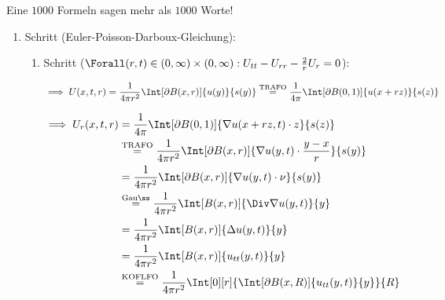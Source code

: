 \begin{solution}

Eine $1000$ Formeln sagen mehr als $1000$ Worte!

\begin{enumerate}[label = \arabic*.]

    \item Schritt (Euler-Poisson-Darboux-Gleichung):
    
    \begin{enumerate}[label = 1.\arabic*.]

        \item Schritt ($\Forall (r, t) \in (0, \infty) \times (0, \infty): U_{tt} - U_{rr} - \frac{2}{r} U_r = 0$):

        \begin{align*}
            \implies
            U(x, t, r)
            =
            \frac{1}{4 \pi r^2}
            \Int[\partial B(x, r)]{u(y)}{s(y)}
            \stackrel
            {
                \mathrm{TRAFO}
            }{=}
            \frac{1}{4 \pi}
            \Int[\partial B(0, 1)]{u(x + r z)}{s(z)}
        \end{align*}
    
        \begin{align*}
            \implies
            U_r(x, t, r)
            & =
            \frac{1}{4 \pi}
            \Int[\partial B(0, 1)]{\nabla u(x + r z, t) \cdot z}{s(z)} \\
            & \stackrel
            {
                \mathrm{TRAFO}
            }{=}
            \frac{1}{4 \pi r^2}
            \Int[\partial B(x, r)]{\nabla u(y, t) \cdot \frac{y - x}{r}}{s(y)} \\
            & =
            \frac{1}{4 \pi r^2}
            \Int[\partial B(x, r)]{\nabla u(y, t) \cdot \nu}{s(y)} \\
            & \stackrel
            {
                \mathrm{Gauß}
            }{=}
            \frac{1}{4 \pi r^2}
            \Int[B(x, r)]{\Div \nabla u(y, t)}{y} \\
            & =
            \frac{1}{4 \pi r^2}
            \Int[B(x, r)]{\Delta u(y, t)}{y} \\
            & =
            \frac{1}{4 \pi r^2}
            \Int[B(x, r)]{u_{tt}(y, t)}{y} \\
            & \stackrel
            {
                \mathrm{KOFLFO}
            }{=}
            \frac{1}{4 \pi r^2}
            \Int[0][r]
            {
                \Int[\partial B(x, R)]{u_{tt}(y, t)}{y}
            }{R}
        \end{align*}
    

\end{enumerate}
\end{enumerate}
\end{solution}

